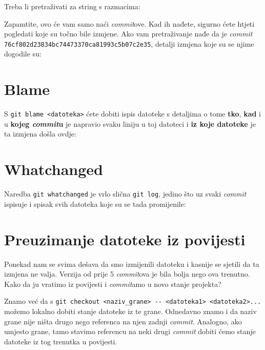 
Treba li pretraživati za string s razmacima:


Zapamtite, ovo će vam samo naći \emph{commit}ove.
Kad ih nađete, sigurno ćete htjeti pogledati koje su točno bile izmjene.
Ako vam pretraživanje nađe da je \emph{commit} \verb+76cf802d23834bc74473370ca81993c5b07c2e35+, detalji izmjena koje su se njime dogodile su:


\section*{Blame}

S \verb+git blame <datoteka>+ ćete dobiti ispis datoteke s detaljima o tome \textbf{tko}, \textbf{kad} i u \textbf{kojeg \emph{commit}u} je napravio svaku liniju u toj datoteci i \textbf{iz koje datoteke} je ta izmjena došla ovdje:



\section*{Whatchanged}

Naredba \verb+git whatchanged+ je vrlo slična \verb+git log+, jedino što uz svaki \emph{commit} ispisuje i spisak svih datoteka koje su se tada promijenile:



\section*{Preuzimanje datoteke iz povijesti}

Ponekad nam se svima dešava da smo izmijenili datoteku i kasnije se sjetili da ta izmjena ne valja. 
Verzija od prije 5 \emph{commit}ova je bila bolja nego ova trenutno.
Kako da ju vratimo iz povijesti i \emph{commit}amo u novo stanje projekta?

Znamo već da s \verb+git checkout <naziv_grane> -- <datoteka1> <datoteka2>...+ možemo lokalno dobiti stanje datoteke iz te grane.
Odnedavno znamo i da naziv grane nije ništa drugo nego referenca na njen zadnji \emph{commit}.
Analogno, ako umjesto grane, tamo stavimo referencu na neki drugi \emph{commit} dobiti ćemo stanje datoteke iz tog trenutka u povijesti.

